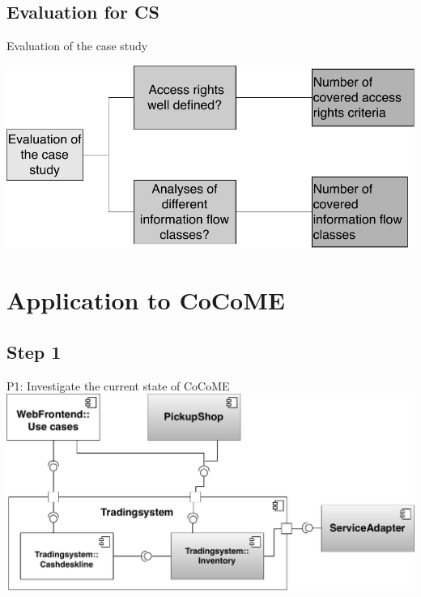 \documentclass[18pt]{beamer}
\begin{document}
\subsection{Evaluation for CS}
\begin{frame}{Evaluation of the case study}


\includegraphics[scale=.55]{logos/OverviewEvalPresMethod.pdf}
\end{frame}

\section{Application to CoCoME}
\subsection{Step 1}
\begin{frame}{P1: Investigate the current state of CoCoME}
\includegraphics[scale=.5]{logos/Overview_CoCoME.pdf}\\
\end{frame}
\end{document}
